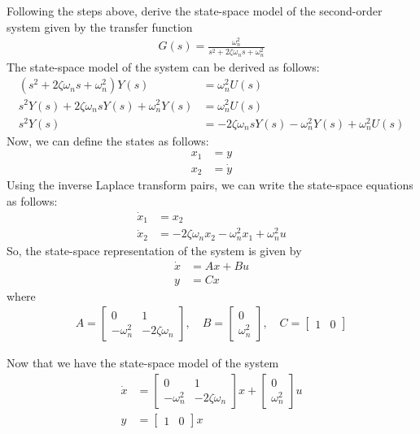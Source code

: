 \documentclass{ee122_notes}
\begin{document}
\begin{popquiz}
Following the steps above, derive the state-space model of the second-order system given by the transfer function
\begin{align*}
    G(s) = \frac{\omega_n^2}{s^2 + 2\zeta \omega_n s + \omega_n^2}
\end{align*}
\popqsplit
The state-space model of the system can be derived as follows:
\begin{align*}
    (s^2 + 2\zeta \omega_n s + \omega_n^2)Y(s) &= \omega_n^2 U(s) \\
    s^2 Y(s) + 2\zeta \omega_n s Y(s) + \omega_n^2 Y(s) &= \omega_n^2 U(s) \\
    s^2 Y(s) &= - 2\zeta \omega_n s Y(s) - \omega_n^2 Y(s) + \omega_n^2 U(s)
\end{align*}
Now, we can define the states as follows:
\begin{align*}
    x_1 &= y \\
    x_2 &= \dot y
\end{align*}
Using the inverse Laplace transform pairs, we can write the state-space equations as follows:
\begin{align*}
    \dot x_1 &= x_2 \\
    \dot x_2 &= - 2\zeta \omega_n x_2 - \omega_n^2 x_1 + \omega_n^2 u
\end{align*}
So, the state-space representation of the system is given by
\begin{align*}
    \dot x &= Ax + Bu \\
    y &= Cx
\end{align*}
where
\begin{align*}
    A = \begin{bmatrix}
    0 & 1 \\
    -\omega_n^2 & -2\zeta \omega_n
    \end{bmatrix}, \quad B = \begin{bmatrix}
    0 \\
    \omega_n^2
    \end{bmatrix}, \quad C = \begin{bmatrix}
    1 & 0
    \end{bmatrix}
\end{align*}
\end{popquiz}
Now that we have the state-space model of the system
\begin{align*}
    \dot x &= \begin{bmatrix}
    0 & 1 \\
    -\omega_n^2 & -2\zeta \omega_n
    \end{bmatrix} x + \begin{bmatrix}
    0 \\
    \omega_n^2
    \end{bmatrix} u \\
    y &= \begin{bmatrix}
    1 & 0
    \end{bmatrix} x
\end{align*}
\end{document}
